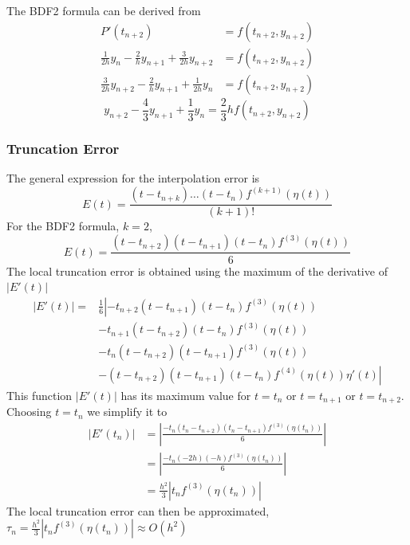 \documentclass[a4paper, 11pt]{article}
\begin{document}
				The BDF2 formula can be derived from
				\begin{align}
					P'(t_{n+2}) &= f(t_{n+2},y_{n+2}) \\
					\frac{1}{2h} y_n - \frac{2}{h} y_{n+1} + \frac{3}{2h} y_{n+2} &=  f(t_{n+2},y_{n+2}) \\
					\frac{3}{2h} y_{n+2} - \frac{2}{h} y_{n+1} + \frac{1}{2h} y_n &=  f(t_{n+2},y_{n+2})
				\end{align}
				\begin{equation}
					y_{n+2} - \frac{4}{3} y_{n+1} + \frac{1}{3} y_n = \frac{2}{3} h f(t_{n+2},y_{n+2}) 
				\end{equation}
			
			\subsubsection*{Truncation Error}
				The general expression for the interpolation error is 
				\begin{equation}
					E(t) = \frac{(t - t_{n+k})\ldots(t - t_{n})f^{(k+1)}(\eta(t))}{(k+1)!}
				\end{equation}
				For the BDF2 formula, $ k = 2 $,
				\begin{equation}
					E(t) = \frac{(t - t_{n+2})(t - t_{n+1})(t - t_{n})f^{(3)}(\eta(t))}{6}
				\end{equation}
				The local truncation error is obtained using the maximum of the derivative of $|E'(t)|$
				\begin{align}
					\left| E'(t) \right| = &\frac{1}{6} \left| -t_{n+2}(t - t_{n+1})(t - t_{n})f^{(3)}(\eta(t)) \right. \\
					 		& \left. -t_{n+1}(t - t_{n+2})(t - t_{n})f^{(3)}(\eta(t)) \right. \\
					 		& \left. -t_{n}(t - t_{n+2})(t - t_{n+1})f^{(3)}(\eta(t)) \right. \\
					 		& \left. -(t - t_{n+2})(t - t_{n+1})(t - t_{n})f^{(4)}(\eta(t))\eta'(t) \right|
				\end{align}
				This function $|E'(t)|$ has its maximum value for $ t = t_n$ or $ t = t_{n+1}$ or $ t = t_{n+2}$.
				Choosing $t = t_{n}$ we simplify it to
				\begin{align}
					|E'(t_{n})| &= \left|\frac{- t_{n}(t_{n} - t_{n+2})(t_{n} - t_{n+1})f^{(3)}(\eta(t_{n}))}{6}\right| \\
							&= \left|\frac{- t_{n}(-2h)(-h)f^{(3)}(\eta(t_{n}))}{6}\right| \\
							&= \frac{h^2}{3}\left|t_nf^{(3)}(\eta(t_n))\right| 
				\end{align}
				The local truncation error can then be approximated, $\tau_n = \frac{h^2}{3}\left|t_nf^{(3)}(\eta(t_n))\right| \approx O(h^2) $
			
\end{document}
